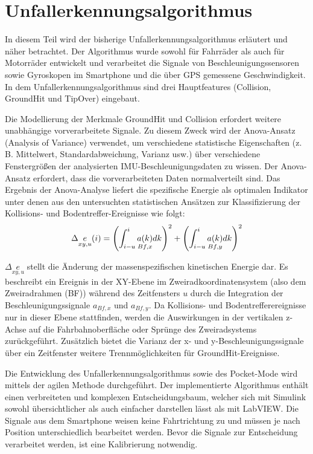 %
%
%
%
%
%
%
\section{Unfallerkennungsalgorithmus} \label{abs:Unfallerkennungsalgorithmus}
%
%
%
%

In diesem Teil wird der bisherige Unfallerkennungsalgorithmus erläutert und näher betrachtet. Der Algorithmus wurde sowohl für Fahrräder als auch für Motorräder entwickelt und verarbeitet die Signale von Beschleunigungssensoren sowie Gyroskopen im Smartphone und die über GPS gemessene Geschwindigkeit. In dem Unfallerkennungsalgorithmus sind drei Hauptfeatures (Collision, GroundHit und TipOver) eingebaut.

Die Modellierung der Merkmale GroundHit und Collision erfordert weitere un\-ab\-hängige vorverarbeitete Signale. Zu diesem Zweck wird der Anova-Ansatz (Analysis of Variance) verwendet, um verschiedene statistische Eigenschaften (z. B. Mittelwert, Standardabweichung, Varianz usw.) über verschiedene Fenstergrößen der analysierten IMU-Beschleunigungsdaten zu wissen. Der Anova-Ansatz erfordert, dass die vorverarbeiteten Daten normalverteilt sind. Das Ergebnis der Anova-Analyse liefert die spezifische Energie als optimalen Indikator unter denen aus den untersuchten statistischen Ansätzen zur Klassifizierung der Kollisions- und Bodentreffer-Ereignisse wie folgt:
\begin{equation}
	\centering
	\begin{gathered}
		\Delta\underset{xy,u}{e} (i) = \left(\int_{i-u}^{i} \underset{Bf,x}{a(k)} dk \right)^2 + \left(\int_{i-u}^{i} \underset{Bf,y}{a(k)} dk \right)^2
		\label{gl:EnergieFormel_JanPaper}
	\end{gathered}
\end{equation}


$\Delta\underset{xy,u}{e}$ stellt die Änderung der massenspezifischen kinetischen Energie dar. Es beschreibt ein Ereignis in der XY-Ebene im Zweiradkoordinatensystem (also dem Zweiradrahmen (BF)) während des Zeitfensters $u$ durch die Integration der Beschleunigungssignale $a_{Bf,x}$ und $a_{Bf,y}$. Da Kollisions- und Bodentrefferereignisse nur in dieser Ebene stattfinden, werden die Auswirkungen in der vertikalen z-Achse auf die Fahrbahnoberfläche oder Sprünge des Zweiradsystems zurückgeführt. Zusätzlich bietet die Varianz der x- und y-Beschleunigungssignale über ein Zeitfenster weitere Trennmöglichkeiten für GroundHit-Ereignisse. \citep{Schneeclassification2021}

Die Entwicklung des Unfallerkennungsalgorithmus sowie des Pocket-Mode wird mittels der agilen Methode durchgeführt. Der implementierte Algorithmus enthält einen verbreiteten und komplexen Entscheidungsbaum, welcher sich mit Simulink sowohl übersichtlicher als auch einfacher darstellen lässt als mit LabVIEW.
Die Signale aus dem Smartphone weisen keine Fahrtrichtung zu und müssen je nach Position unterschiedlich bearbeitet werden. Bevor die Signale zur Entscheidung verarbeitet werden, ist eine Kalibrierung notwendig.

